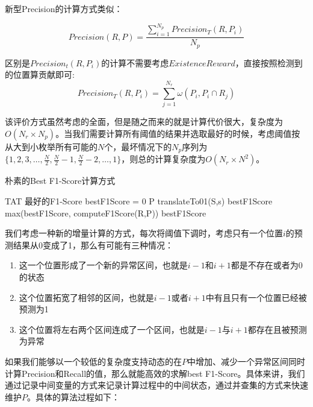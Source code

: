 新型Precision的计算方式类似：

\begin{equation}
Precision(R,P) = \frac{\sum_{i=1}^{N_p}Precision_T(R,P_i)}{N_p}
\end{equation}

区别是$Precision_t(R,P_i)$的计算不需要考虑$ExistenceReward$，直接按照检测到的位置算贡献即可:
\begin{equation}
Precision_T(R,P_i) = \sum_{j=1}^{N_r}\omega(P_i,P_i\cap R_j)
\end{equation}


  该评价方式虽然考虑的全面，但是随之而来的就是计算代价很大，复杂度为$O(N_r\times N_p)$。当我们需要计算所有阈值的结果并选取最好的时候，考虑阈值按从大到小枚举所有可能的$N$个，最坏情况下的$N_p$序列为$\{1,2,3,\dots,\frac{N}{2},\frac{N}{2}-1,\frac{N}{2}-2,\dots,1\}$，则总的计算复杂度为$O(N_r\times N^2)$。

  \begin{algorithm}
  \caption{朴素的Best F1-Score计算方式}
  \begin{algorithmic}[1]
    \Require TAT
    \Ensure 最好的F1-Score
    \State bestF1Score = 0
    \State P \gets translateTo01(S,s)
    \State bestF1Score \gets max(bestF1Score, computeF1Score(R,P))
    \EndFor
    \State \Return bestF1Score
    \EndFunction
  \end{algorithmic}
  \end{algorithm}


  我们考虑一种新的增量计算的方式，每次将阈值下调时，考虑只有一个位置$i$的预测结果从0变成了1，那么有可能有三种情况：
  \begin{enumerate}
    \item 这一个位置形成了一个新的异常区间，也就是$i-1$和$i+1$都是不存在或者为0的状态
    \item 这个位置拓宽了相邻的区间，也就是$i-1$或者$i+1$中有且只有一个位置已经被预测为1
    \item 这个位置将左右两个区间连成了一个区间，也就是$i-1$与$i+1$都存在且被预测为异常
  \end{enumerate}

  如果我们能够以一个较低的复杂度支持动态的在$P$中增加、减少一个异常区间同时计算Precision和Recall的值，那么就能高效的求解best F1-Score。具体来讲，我们通过记录中间变量的方式来记录计算过程中的中间状态，通过并查集的方式来快速维护$P$。具体的算法过程如下：

